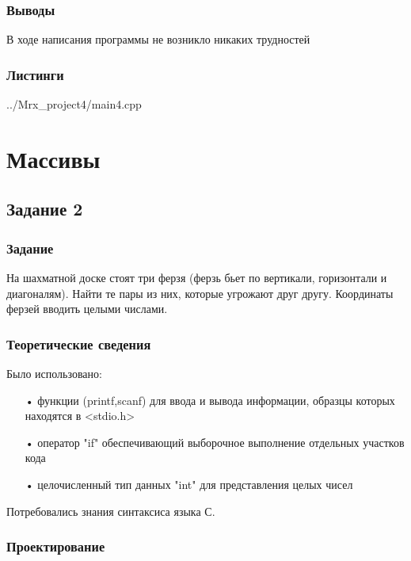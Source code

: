 \documentclass[12pt,a4paper]{report}
\begin{document}
\subsection{Выводы}

В ходе написания программы не возникло никаких трудностей

\subsection*{Листинги}


{../Mrx_project4/main4.cpp}


\chapter{Массивы}

\section{Задание 2}

\subsection{Задание}

На шахматной доске стоят три ферзя (ферзь бьет по вертикали, горизонтали и диагоналям). Найти те пары из них, которые угрожают друг другу. Координаты ферзей вводить целыми числами.

\subsection{Теоретические сведения}

Было использовано:
\begin{enumerate}
\item[•] функции (printf,scanf) для ввода и вывода информации, образцы которых находятся в <stdio.h>
\item[•] оператор "if" обеспечивающий выборочное выполнение отдельных участков кода
\item[•] целочисленный тип данных "int" для представления целых чисел
\end{enumerate}

Потребовались знания синтаксиса языка С.

\subsection{Проектирование}
\end{document}
